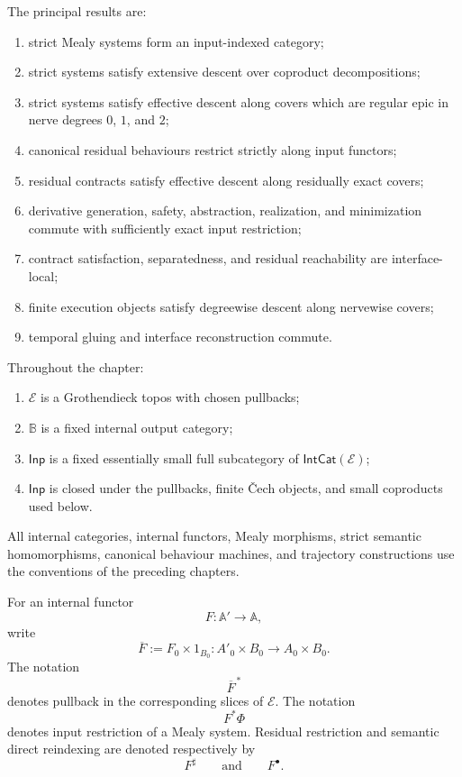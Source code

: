 The principal results are:
\begin{enumerate}
    \item strict Mealy systems form an input-indexed category;
    \item strict systems satisfy extensive descent over coproduct
    decompositions;
    \item strict systems satisfy effective descent along covers which are
    regular epic in nerve degrees \(0\), \(1\), and \(2\);
    \item canonical residual behaviours restrict strictly along input
    functors;
    \item residual contracts satisfy effective descent along residually exact
    covers;
    \item derivative generation, safety, abstraction, realization, and
    minimization commute with sufficiently exact input restriction;
    \item contract satisfaction, separatedness, and residual reachability are
    interface-local;
    \item finite execution objects satisfy degreewise descent along nervewise
    covers;
    \item temporal gluing and interface reconstruction commute.
\end{enumerate}

Throughout the chapter:
\begin{enumerate}
    \item \(\mathcal E\) is a Grothendieck topos with chosen pullbacks;
    \item \(\mathbb B\) is a fixed internal output category;
    \item \(\mathsf{Inp}\) is a fixed essentially small full subcategory of
    \(\mathsf{IntCat}(\mathcal E)\);
    \item \(\mathsf{Inp}\) is closed under the pullbacks, finite Čech objects,
    and small coproducts used below.
\end{enumerate}

All internal categories, internal functors, Mealy morphisms, strict semantic
homomorphisms, canonical behaviour machines, and trajectory constructions use
the conventions of the preceding chapters.

For an internal functor
\[
    F:\mathbb A'\to\mathbb A,
\]
write
\[
    \overline F
    :=
    F_0\times 1_{B_0}:
    A'_0\times B_0
    \to
    A_0\times B_0.
\]
The notation
\[
    \overline F^{\,\ast}
\]
denotes pullback in the corresponding slices of \(\mathcal E\). The notation
\[
    F^\ast\Phi
\]
denotes input restriction of a Mealy system. Residual restriction and semantic
direct reindexing are denoted respectively by
\[
    F^\sharp
    \qquad\text{and}\qquad
    F^\bullet.
\]

